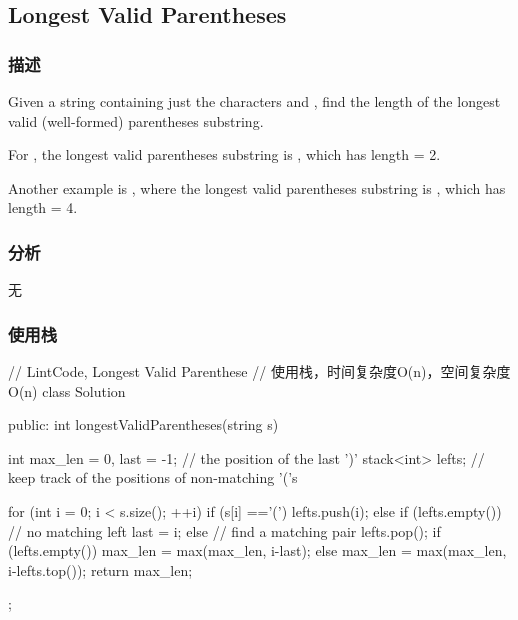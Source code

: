 \subsection{Longest Valid Parentheses} %
\label{sec:longest-valid-parentheses}


\subsubsection{描述}
Given a string containing just the characters  and , find the length of the longest valid (well-formed) parentheses substring.

For , the longest valid parentheses substring is , which has length = 2.

Another example is , where the longest valid parentheses substring is , which has length = 4.


\subsubsection{分析}
无


\subsubsection{使用栈}
\begin{Code}
// LintCode, Longest Valid Parenthese
// 使用栈，时间复杂度O(n)，空间复杂度O(n)
class Solution {
public:
    int longestValidParentheses(string s) {
        int max_len = 0, last = -1; // the position of the last ')'
        stack<int> lefts;  // keep track of the positions of non-matching '('s

        for (int i = 0; i < s.size(); ++i) {
            if (s[i] =='(') {
                lefts.push(i);
            } else {
                if (lefts.empty()) {
                    // no matching left
                    last = i;
                } else {
                    // find a matching pair
                    lefts.pop();
                    if (lefts.empty()) {
                        max_len = max(max_len, i-last);
                    } else {
                        max_len = max(max_len, i-lefts.top());
                    }
                }
            }
        }
        return max_len;
    }
};
\end{Code}

